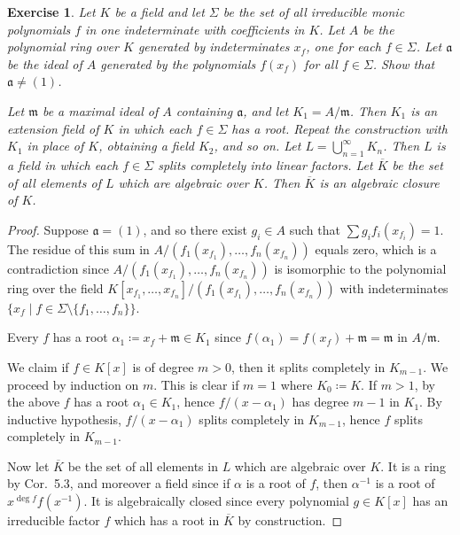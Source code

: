 \documentclass[12pt,letterpaper]{article}
\newtheorem{problem}{Exercise}[section]
\theoremstyle{definition}
\theoremstyle{remark}
\numberwithin{figure}{problem}
\numberwithin{equation}{section}
\begin{document}
\begin{problem}
  Let $K$ be a field and let $\Sigma$ be the set of all irreducible monic polynomials $f$ in one indeterminate with coefficients in $K$. Let $A$ be the polynomial ring over $K$ generated by indeterminates $x_f$, one for each $f \in \Sigma$. Let $\mathfrak{a}$ be the ideal of $A$ generated by the polynomials $f(x_f)$ for all $f \in \Sigma$. Show that $\mathfrak{a} \ne (1)$.
  \par Let $\mathfrak{m}$ be a maximal ideal of $A$ containing $\mathfrak{a}$, and let $K_1 = A/\mathfrak{m}$. Then $K_1$ is an extension field of $K$ in which each $f \in \Sigma$ has a root. Repeat the construction with $K_1$ in place of $K$, obtaining a field $K_2$, and so on. Let $L = \bigcup_{n=1}^\infty K_n$. Then $L$ is a field in which each $f \in \Sigma$ splits completely into linear factors. Let $\overline{K}$ be the set of all elements of $L$ which are algebraic over $K$. Then $\overline{K}$ is an algebraic closure of $K$.
\end{problem}
\begin{proof}
  Suppose $\mathfrak{a} = (1)$, and so there exist $g_i \in A$ such that $\sum g_if_i(x_{f_i}) = 1$. The residue of this sum in $A/(f_1(x_{f_1}),\ldots,f_n(x_{f_n}))$ equals zero, which is a contradiction since $A/(f_1(x_{f_1}),\ldots,f_n(x_{f_n}))$ is isomorphic to the polynomial ring over the field $K[x_{f_1},\ldots,x_{f_n}]/(f_1(x_{f_1}),\ldots,f_n(x_{f_n}))$ with indeterminates $\{x_f \mid f \in \Sigma \setminus \{f_1,\ldots,f_n\}\}$.
  \par Every $f$ has a root $\alpha_1 \coloneqq x_f + \mathfrak{m} \in K_1$ since $f(\alpha_1) = f(x_f) + \mathfrak{m} = \mathfrak{m}$ in $A/\mathfrak{m}$.
  \par We claim if $f \in K[x]$ is of degree $m>0$, then it splits completely in $K_{m-1}$. We proceed by induction on $m$. This is clear if $m=1$ where $K_0 \coloneqq K$. If $m > 1$, by the above $f$ has a root $\alpha_1 \in K_{1}$, hence $f/(x-\alpha_1)$ has degree $m-1$ in $K_{1}$. By inductive hypothesis, $f/(x-\alpha_1)$ splits completely in $K_{m-1}$, hence $f$ splits completely in $K_{m-1}$.
  \par Now let $\overline{K}$ be the set of all elements in $L$ which are algebraic over $K$. It is a ring by Cor.~5.3, and moreover a field since if $\alpha$ is a root of $f$, then $\alpha^{-1}$ is a root of $x^{\deg f}f(x^{-1})$. It is algebraically closed since every polynomial $g \in K[x]$ has an irreducible factor $f$ which has a root in $\overline{K}$ by construction.
\end{proof}
\end{document}
